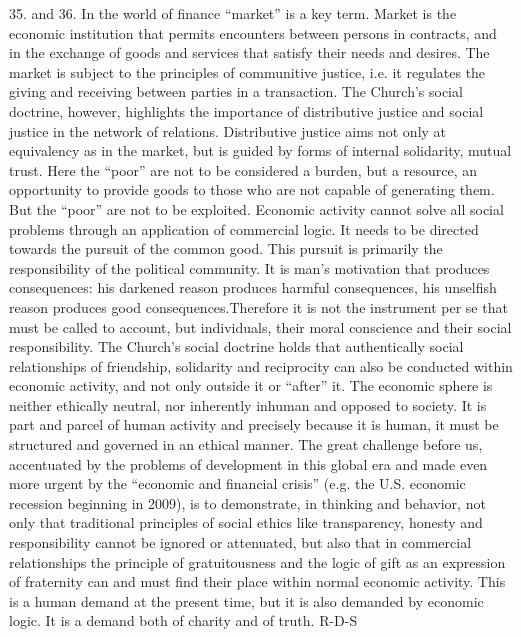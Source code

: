\documentclass[oneside]{book}
\begin{document}
35. and 36. In the world of finance ``market'' is a key term. Market is the
economic institution that permits encounters between persons in contracts, and
in the exchange of goods and services that satisfy their needs and desires. The
market is subject to the principles of communitive justice, i.e. it regulates
the giving and receiving between parties in a transaction. The Church's social
doctrine, however, highlights the importance of distributive justice and social
justice in the network of relations. Distributive justice aims not only at
equivalency as in the market, but is guided by forms of internal solidarity,
mutual trust. Here the ``poor'' are not to be considered a burden, but a
resource, an opportunity to provide goods to those who are not capable of
generating them. But the ``poor'' are not to be exploited. Economic activity
cannot solve all social problems through an application of commercial logic. It
needs to be directed towards the pursuit of the common good. This pursuit is
primarily the responsibility of the political community. It is man's motivation
that produces consequences: his darkened reason produces harmful consequences,
his unselfish reason produces good consequences.Therefore it is not the
instrument per se that must be called to account, but individuals, their moral
conscience and their social responsibility. The Church's social doctrine holds
that authentically social relationships of friendship, solidarity and
reciprocity can also be conducted within economic activity, and not only outside
it or ``after'' it. The economic sphere is neither ethically neutral, nor
inherently inhuman and opposed to society. It is part and parcel of human
activity and precisely because it is human, it must be structured and governed
in an ethical manner.
The great challenge before us, accentuated by the problems of development in
this global era and made even more urgent by the ``economic and financial
crisis'' (e.g. the U.S. economic recession beginning in 2009), is to
demonstrate, in thinking and behavior, not only that traditional principles of
social ethics like transparency, honesty and responsibility cannot be ignored or
attenuated, but also that in commercial relationships the principle of
gratuitousness and the logic of gift as an expression of fraternity can and must
find their place within normal economic activity. This is a human demand at the
present time, but it is also demanded by economic logic. It is a demand both of
charity and of truth.
R-D-S
\end{document}

